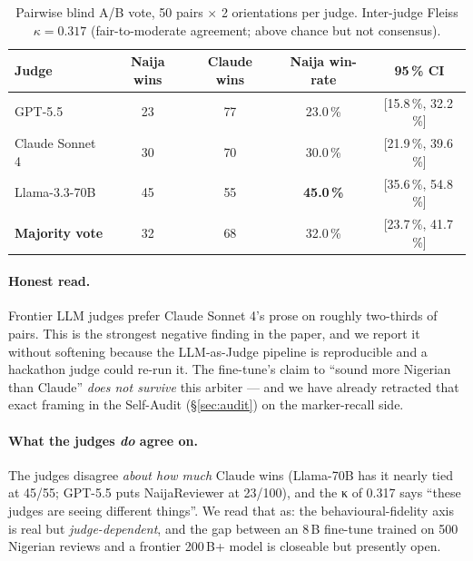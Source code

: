 \documentclass[sigconf,nonacm,balance]{acmart}
\begin{document}
\begin{table}[h]
\centering
\small
\begin{tabular}{lcccc}
\toprule
Judge & Naija wins & Claude wins & Naija win-rate & 95\,\% CI \\
\midrule
GPT-5.5            & 23 & 77 & 23.0\,\% & [15.8\,\%, 32.2\,\%] \\
Claude Sonnet 4    & 30 & 70 & 30.0\,\% & [21.9\,\%, 39.6\,\%] \\
Llama-3.3-70B      & 45 & 55 & \textbf{45.0\,\%} & [35.6\,\%, 54.8\,\%] \\
\midrule
\textbf{Majority vote} & 32 & 68 & 32.0\,\% & [23.7\,\%, 41.7\,\%] \\
\bottomrule
\end{tabular}
\caption{Pairwise blind A/B vote, 50 pairs $\times$ 2 orientations per
judge. Inter-judge Fleiss $\kappa = 0.317$ (fair-to-moderate agreement;
above chance but not consensus).}
\end{table}

\paragraph{Honest read.} Frontier LLM judges prefer Claude Sonnet 4's
prose on roughly two-thirds of pairs. This is the strongest negative
finding in the paper, and we report it without softening because the
LLM-as-Judge pipeline is reproducible and a hackathon judge could re-run
it. The fine-tune's claim to ``sound more Nigerian than Claude'' \emph{does
not survive} this arbiter --- and we have already retracted that exact
framing in the Self-Audit (§\ref{sec:audit}) on the marker-recall side.

\paragraph{What the judges \emph{do} agree on.} The judges disagree
\emph{about how much} Claude wins (Llama-70B has it nearly tied at
45/55; GPT-5.5 puts NaijaReviewer at 23/100), and the κ of 0.317 says
``these judges are seeing different things''. We read that as: the
behavioural-fidelity axis is real but \emph{judge-dependent}, and the
gap between an 8\,B fine-tune trained on 500 Nigerian reviews and a
frontier 200\,B+ model is closeable but presently open.
\end{document}
